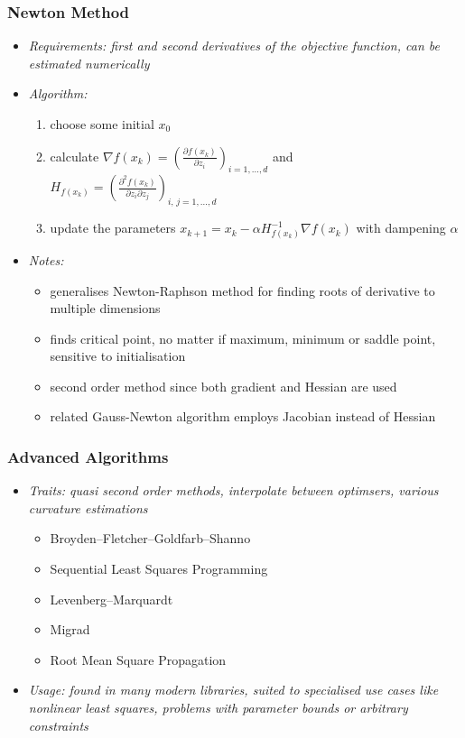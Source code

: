 	\begin{frame}
		\frametitle{Newton Method}
		\begin{itemize}
			\item<2-> \itshape{Requirements:} first and second derivatives of the objective function, can be estimated numerically
			\item<3-> \itshape{Algorithm:}
				\begin{enumerate}
					\item<4-> choose some initial $x_0$\vspace{1ex}
					\item<5-> calculate $\nabla f(x_k) = \left(\frac{\partial f(x_k)}{\partial z_i}\right)_{i = 1,\ldots,d}$ and
							  $H_{f(x_k)} = \left(\frac{\partial^2 f(x_k)}{\partial z_i \partial z_j}\right)_{i,\,j = 1,\ldots,d}$
					\item<6-> update the parameters $x_{k+1} = x_k - \alpha H_{f(x_k)}^{-1} \nabla f(x_k)$ with dampening $\alpha$
				\end{enumerate}
			\item<7-> \itshape{Notes:}
				\begin{itemize}
					\item<8-> generalises Newton-Raphson method for finding roots of derivative to multiple dimensions
					\item<9-> finds critical point, no matter if maximum, minimum or saddle point, sensitive to initialisation
					\item<10-> second order method since both gradient and Hessian are used
					\item<11-> related Gauss-Newton algorithm employs Jacobian instead of Hessian
				\end{itemize}
		\end{itemize}
	\end{frame}

	\begin{frame}
		\frametitle{Advanced Algorithms}
		\begin{itemize}
			\item<2-> \itshape{Traits:} quasi second order methods, interpolate between optimsers, various curvature estimations
			\begin{itemize}
				\item<3-> Broyden–Fletcher–Goldfarb–Shanno
				\item<4-> Sequential Least Squares Programming
				\item<5-> Levenberg–Marquardt
				\item<6-> Migrad
				\item<7-> Root Mean Square Propagation
			\end{itemize}
			\item<8-> \itshape{Usage:} found in many modern libraries, suited to specialised use cases like nonlinear least squares,
									   problems with parameter bounds or arbitrary constraints
		\end{itemize}
	\end{frame}

